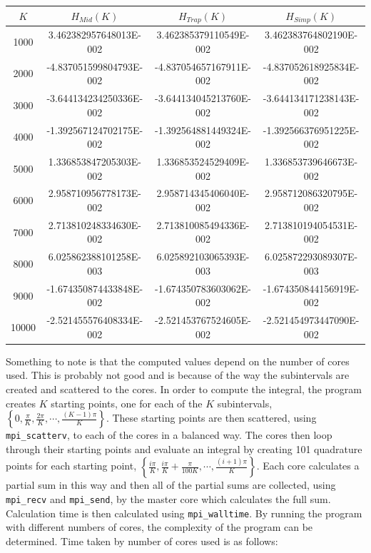 \documentclass{article}
\theoremstyle{remark}
\theoremstyle{remark}
\newcommand{\p}{\phantom{-}}
\begin{document}
	\begin{table}[H]
		\begin{tabular}{cccc}
			\toprule[0.5mm]
			 $K$  &        $H_{Mid}(K)$       &       $H_{Trap}(K)$       &       $H_{Simp}(K)$       \\ 
			\midrule
		 	 1000 & \p 3.462382957648013E-002 & \p 3.462385379110549E-002 & \p 3.462383764802190E-002 \\
			 2000 &   -4.837051599804793E-002 &   -4.837054657167911E-002 &   -4.837052618925834E-002 \\
			 3000 &   -3.644134234250336E-002 &   -3.644134045213760E-002 &   -3.644134171238143E-002 \\
			 4000 &   -1.392567124702175E-002 &   -1.392564881449324E-002 &   -1.392566376951225E-002 \\
			 5000 & \p 1.336853847205303E-002 & \p 1.336853524529409E-002 & \p 1.336853739646673E-002 \\
			 6000 & \p 2.958710956778173E-002 & \p 2.958714345406040E-002 & \p 2.958712086320795E-002 \\
			 7000 & \p 2.713810248334630E-002 & \p 2.713810085494336E-002 & \p 2.713810194054531E-002 \\
			 8000 & \p 6.025862388101258E-003 & \p 6.025892103065393E-003 & \p 6.025872293089307E-003 \\
			 9000 &   -1.674350874433848E-002 &   -1.674350783603062E-002 &   -1.674350844156919E-002 \\
			10000 &   -2.521455576408334E-002 &   -2.521453767524605E-002 &   -2.521454973447090E-002 \\
			\bottomrule[0.5mm]
		\end{tabular}
	\end{table}
	Something to note is that the computed values depend on the number of cores used. This is probably not good and is because of the way the subintervals are created and scattered to the cores. In order to compute the integral, the program creates $K$ starting points, one for each of the $K$ subintervals, $\left\{0,\frac{\pi}{K},\frac{2\pi}{K},\cdots,\frac{(K-1)\pi}{K}\right\}$. These starting points are then scattered, using \verb!mpi_scatterv!, to each of the cores in a balanced way. The cores then loop through their starting points and evaluate an integral by creating 101 quadrature points for each starting point, $\left\{\frac{i\pi}{K},\frac{i\pi}{K}+\frac{\pi}{100K},\cdots,\frac{(i+1)\pi}{K}\right\}$. Each core calculates a partial sum in this way and then all of the partial sums are collected, using \verb!mpi_recv! and \verb!mpi_send!, by the master core which calculates the full sum. Calculation time is then calculated using \verb!mpi_walltime!. By running the program with different numbers of cores, the complexity of the program can be determined. Time taken by number of cores used is as follows: \par
\end{document}
